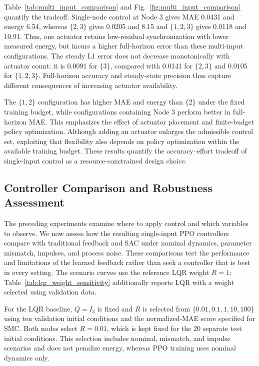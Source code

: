 \documentclass[a4paper,fleqn]{cas-dc}
\theoremstyle{plain}
\theoremstyle{definition}
\begin{document}
Table~\ref{tab:multi_input_comparison} and Fig.~\ref{fig:multi_input_comparison} quantify the tradeoff. Single-node control at Node 3 gives MAE 0.0431 and energy 6.54, whereas $\{2,3\}$ gives 0.0205 and 8.15 and $\{1,2,3\}$ gives 0.0118 and 10.91. Thus, one actuator retains low-residual synchronization with lower measured energy, but incurs a higher full-horizon error than these multi-input configurations. The steady L1 error does not decrease monotonically with actuator count: it is 0.0091 for $\{3\}$, compared with 0.0141 for $\{2,3\}$ and 0.0105 for $\{1,2,3\}$. Full-horizon accuracy and steady-state precision thus capture different consequences of increasing actuator availability.

The $\{1,2\}$ configuration has higher MAE and energy than $\{2\}$ under the fixed training budget, while configurations containing Node 3 perform better in full-horizon MAE. This emphasizes the effect of actuator placement and finite-budget policy optimization. Although adding an actuator enlarges the admissible control set, exploiting that flexibility also depends on policy optimization within the available training budget. These results quantify the accuracy--effort tradeoff of single-input control as a resource-constrained design choice.

\subsection{Controller Comparison and Robustness Assessment}
\label{subsec:robustness_tests}

The preceding experiments examine where to apply control and which variables to observe. We now assess how the resulting single-input PPO controllers compare with traditional feedback and SAC under nominal dynamics, parameter mismatch, impulses, and process noise. These comparisons test the performance and limitations of the learned feedback rather than seek a controller that is best in every setting. The scenario curves use the reference LQR weight $R=1$; Table~\ref{tab:lqr_weight_sensitivity} additionally reports LQR with a weight selected using validation data.


For the LQR baseline, $Q=I_3$ is fixed and $R$ is selected from $\{0.01,0.1,1,10,100\}$ using ten validation initial conditions and the normalized-MAE score specified for SMC. Both nodes select $R=0.01$, which is kept fixed for the 20 separate test initial conditions. This selection includes nominal, mismatch, and impulse scenarios and does not penalize energy, whereas PPO training uses nominal dynamics only.
\end{document}
